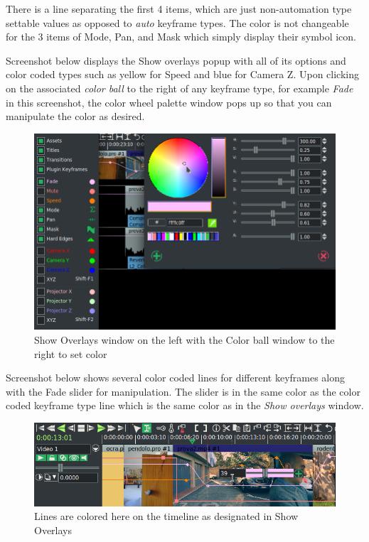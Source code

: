 There is a line separating the first 4 items, which are just non-automation type settable values as opposed to \textit{auto} keyframe types.  
The color is not changeable for the 3 items of Mode, Pan, and Mask which simply display their symbol icon.

Screenshot below displays the Show overlays popup with all of its options and color coded types such as yellow for Speed and blue for Camera Z.  
Upon clicking on the associated \textit{color ball} to the right of any keyframe type, for example \textit{Fade} in this screenshot, the color wheel palette window pops up so that you can manipulate the color as desired.

\begin{figure}[htpb]
    \centering
    \includegraphics[width=0.99\linewidth]{images/overlays_window.png}
    \caption{Show Overlays window on the left with the Color ball window to the right to set color}
    \label{fig:overlays_window}
\end{figure}

Screenshot below shows several color coded lines for different keyframes along with the Fade slider for manipulation.  
The slider is in the same color as the color coded keyframe type line which is the same color as in the \textit{Show overlays} window.

\begin{figure}[htpb]
    \centering
    \includegraphics[width=0.8\linewidth]{images/overlays1.png}
    \caption{Lines are colored here on the timeline as designated in Show Overlays}
    \label{fig:overlays1}
\end{figure}

